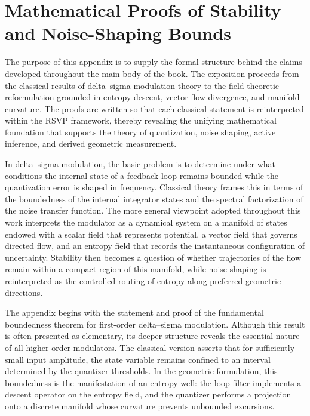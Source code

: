 
\chapter{Mathematical Proofs of Stability and Noise-Shaping Bounds}

The purpose of this appendix is to supply the formal structure behind the claims developed throughout the main body of the book. The exposition proceeds from the classical results of delta–sigma modulation theory to the field-theoretic reformulation grounded in entropy descent, vector-flow divergence, and manifold curvature. The proofs are written so that each classical statement is reinterpreted within the RSVP framework, thereby revealing the unifying mathematical foundation that supports the theory of quantization, noise shaping, active inference, and derived geometric measurement.

In delta–sigma modulation, the basic problem is to determine under what conditions the internal state of a feedback loop remains bounded while the quantization error is shaped in frequency. Classical theory frames this in terms of the boundedness of the internal integrator states and the spectral factorization of the noise transfer function. The more general viewpoint adopted throughout this work interprets the modulator as a dynamical system on a manifold of states endowed with a scalar field that represents potential, a vector field that governs directed flow, and an entropy field that records the instantaneous configuration of uncertainty. Stability then becomes a question of whether trajectories of the flow remain within a compact region of this manifold, while noise shaping is reinterpreted as the controlled routing of entropy along preferred geometric directions.

The appendix begins with the statement and proof of the fundamental boundedness theorem for first-order delta–sigma modulation. Although this result is often presented as elementary, its deeper structure reveals the essential nature of all higher-order modulators. The classical version asserts that for sufficiently small input amplitude, the state variable remains confined to an interval determined by the quantizer thresholds. In the geometric formulation, this boundedness is the manifestation of an entropy well: the loop filter implements a descent operator on the entropy field, and the quantizer performs a projection onto a discrete manifold whose curvature prevents unbounded excursions.

